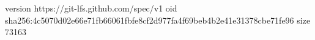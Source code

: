 version https://git-lfs.github.com/spec/v1
oid sha256:4c5070d02e66e71fb66061fbfe8cf2d977fa4f69beb4b2e41e31378cbe71fe96
size 73163
